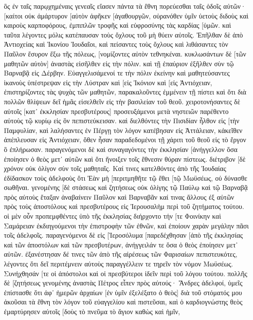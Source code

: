 ὃς ἐν ταῖς παρῳχημέναις γενεαῖς εἴασεν πάντα τὰ ἔθνη πορεύεσθαι ταῖς ὁδοῖς αὐτῶν· 
[καίτοι οὐκ ἀμάρτυρον [αὑτὸν ἀφῆκεν [ἀγαθουργῶν, οὐρανόθεν ὑμῖν ὑετοὺς διδοὺς καὶ καιροὺς καρποφόρους, ἐμπιπλῶν τροφῆς καὶ εὐφροσύνης τὰς καρδίας [ὑμῶν. 
καὶ ταῦτα λέγοντες μόλις κατέπαυσαν τοὺς ὄχλους τοῦ μὴ θύειν αὐτοῖς. 
Ἐπῆλθαν δὲ ἀπὸ Ἀντιοχείας καὶ Ἰκονίου Ἰουδαῖοι, καὶ πείσαντες τοὺς ὄχλους καὶ λιθάσαντες τὸν Παῦλον ἔσυρον ἔξω τῆς πόλεως, [νομίζοντες αὐτὸν τεθνηκέναι. 
κυκλωσάντων δὲ [τῶν μαθητῶν αὐτὸν] ἀναστὰς εἰσῆλθεν εἰς τὴν πόλιν. καὶ τῇ ἐπαύριον ἐξῆλθεν σὺν τῷ Βαρναβᾷ εἰς Δέρβην. 
Εὐαγγελισάμενοί τε τὴν πόλιν ἐκείνην καὶ μαθητεύσαντες ἱκανοὺς ὑπέστρεψαν εἰς τὴν Λύστραν καὶ [εἰς Ἰκόνιον καὶ [εἰς Ἀντιόχειαν, 
ἐπιστηρίζοντες τὰς ψυχὰς τῶν μαθητῶν, παρακαλοῦντες ἐμμένειν τῇ πίστει καὶ ὅτι διὰ πολλῶν θλίψεων δεῖ ἡμᾶς εἰσελθεῖν εἰς τὴν βασιλείαν τοῦ θεοῦ. 
χειροτονήσαντες δὲ αὐτοῖς [κατ᾽ ἐκκλησίαν πρεσβυτέρους] προσευξάμενοι μετὰ νηστειῶν παρέθεντο αὐτοὺς τῷ κυρίῳ εἰς ὃν πεπιστεύκεισαν. 
καὶ διελθόντες τὴν Πισιδίαν ἦλθον εἰς [τὴν Παμφυλίαν, 
καὶ λαλήσαντες ἐν Πέργῃ τὸν λόγον κατέβησαν εἰς Ἀττάλειαν, 
κἀκεῖθεν ἀπέπλευσαν εἰς Ἀντιόχειαν, ὅθεν ἦσαν παραδεδομένοι τῇ χάριτι τοῦ θεοῦ εἰς τὸ ἔργον ὃ ἐπλήρωσαν. 
παραγενόμενοι δὲ καὶ συναγαγόντες τὴν ἐκκλησίαν [ἀνήγγελλον ὅσα ἐποίησεν ὁ θεὸς μετ᾽ αὐτῶν καὶ ὅτι ἤνοιξεν τοῖς ἔθνεσιν θύραν πίστεως. 
διέτριβον [δὲ χρόνον οὐκ ὀλίγον σὺν τοῖς μαθηταῖς. 
Καί τινες κατελθόντες ἀπὸ τῆς Ἰουδαίας ἐδίδασκον τοὺς ἀδελφοὺς ὅτι Ἐὰν μὴ [περιτμηθῆτε τῷ ἔθει [τῷ Μωϋσέως, οὐ δύνασθε σωθῆναι. 
γενομένης [δὲ στάσεως καὶ ζητήσεως οὐκ ὀλίγης τῷ Παύλῳ καὶ τῷ Βαρναβᾷ πρὸς αὐτοὺς ἔταξαν ἀναβαίνειν Παῦλον καὶ Βαρναβᾶν καί τινας ἄλλους ἐξ αὐτῶν πρὸς τοὺς ἀποστόλους καὶ πρεσβυτέρους εἰς Ἰερουσαλὴμ περὶ τοῦ ζητήματος τούτου. 
οἱ μὲν οὖν προπεμφθέντες ὑπὸ τῆς ἐκκλησίας διήρχοντο τήν [τε Φοινίκην καὶ Σαμάρειαν ἐκδιηγούμενοι τὴν ἐπιστροφὴν τῶν ἐθνῶν, καὶ ἐποίουν χαρὰν μεγάλην πᾶσι τοῖς ἀδελφοῖς. 
παραγενόμενοι δὲ εἰς [Ἱεροσόλυμα [παρεδέχθησαν [ἀπὸ τῆς ἐκκλησίας καὶ τῶν ἀποστόλων καὶ τῶν πρεσβυτέρων, ἀνήγγειλάν τε ὅσα ὁ θεὸς ἐποίησεν μετ᾽ αὐτῶν. 
ἐξανέστησαν δέ τινες τῶν ἀπὸ τῆς αἱρέσεως τῶν Φαρισαίων πεπιστευκότες, λέγοντες ὅτι δεῖ περιτέμνειν αὐτοὺς παραγγέλλειν τε τηρεῖν τὸν νόμον Μωϋσέως. 
Συνήχθησάν [τε οἱ ἀπόστολοι καὶ οἱ πρεσβύτεροι ἰδεῖν περὶ τοῦ λόγου τούτου. 
πολλῆς δὲ [ζητήσεως γενομένης ἀναστὰς Πέτρος εἶπεν πρὸς αὐτούς· Ἄνδρες ἀδελφοί, ὑμεῖς ἐπίστασθε ὅτι ἀφ᾽ ἡμερῶν ἀρχαίων [ἐν ὑμῖν ἐξελέξατο ὁ θεὸς] διὰ τοῦ στόματός μου ἀκοῦσαι τὰ ἔθνη τὸν λόγον τοῦ εὐαγγελίου καὶ πιστεῦσαι, 
καὶ ὁ καρδιογνώστης θεὸς ἐμαρτύρησεν αὐτοῖς [δοὺς τὸ πνεῦμα τὸ ἅγιον καθὼς καὶ ἡμῖν, 

